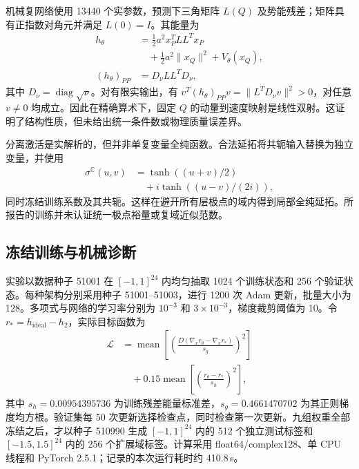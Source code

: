 机械复网络使用 13440 个实参数，预测下三角矩阵 $L(Q)$ 及势能残差；矩阵具有正指数对角元并满足 $L(0)=I$。其能量为
\begin{equation}
 \begin{aligned}
 h_\theta&=\tfrac12a^2x_P^TLL^Tx_P\\
 &\quad+\tfrac12a^2\|x_Q\|^2+V_\theta(x_Q),\\
 (h_\theta)_{PP}&=D_\nu LL^TD_\nu,
 \end{aligned}
 \label{eq:learn-spd}
\end{equation}
其中 $D_\nu=\operatorname{diag}\sqrt\nu$。对有限实输出，有 $v^T(h_\theta)_{PP}v=\|L^TD_\nu v\|^2>0$，对任意 $v\ne0$ 均成立。因此在精确算术下，固定 $Q$ 的动量到速度映射是线性双射。这证明了结构性质，但未给出统一条件数或物理质量误差界。

分离激活是实解析的，但并非单复变量全纯函数。合法延拓将共轭输入替换为独立变量，并使用
\begin{equation}
 \begin{aligned}
 \sigma^{\mathbb C}(u,v)&=\tanh((u+v)/2)\\
 &\quad+i\tanh((u-v)/(2i)),
 \end{aligned}
 \label{eq:learn-analytic-extension}
\end{equation}
同时冻结训练系数及其共轭。这样在避开所有层极点的域内得到局部全纯延拓。所报告的训练并未认证统一极点裕量或复域近似范数。

\subsection{冻结训练与机械诊断}
实验以数据种子 51001 在 $[-1,1]^{24}$ 内均匀抽取 1024 个训练状态和 256 个验证状态。每种架构分别采用种子 51001--51003，进行 1200 次 Adam 更新，批量大小为 128。多项式与网络的学习率分别为 $10^{-3}$ 和 $3\times10^{-3}$，梯度裁剪阈值为 10。令 $r_*=h_{\mathrm{ideal}}-h_2$，实际目标函数为
\begin{equation}
 \begin{aligned}
 \mathcal L&=\operatorname{mean}\left[\left(\frac{D(\nabla_xr_\theta-\nabla_xr_*)}{s_g}\right)^2\right]\\
 &\quad+0.15\operatorname{mean}\left[\left(\frac{r_\theta-r_*}{s_h}\right)^2\right],
 \end{aligned}
 \label{eq:learn-objective}
\end{equation}
其中 $s_h=0.00954395736$ 为训练残差能量标准差，$s_g=0.4661470702$ 为其正则梯度均方根。验证集每 50 次更新选择检查点，同时检查第一次更新。九组权重全部冻结之后，才以种子 510990 生成 $[-1,1]^{24}$ 内的 512 个独立测试标签和 $[-1.5,1.5]^{24}$ 内的 256 个扩展域标签。计算采用 float64/complex128、单 CPU 线程和 PyTorch 2.5.1；记录的本次运行耗时约 410.8\,s。

